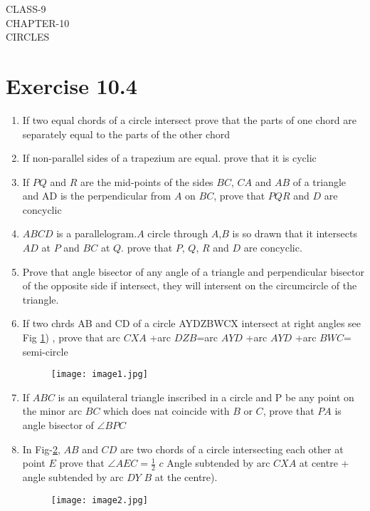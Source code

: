 \documentclass[12pt]{article}
\begin{document}
\begin{center}
\textbf\large{CLASS-9\\CHAPTER-10 \\ CIRCLES}
\end{center}
\section*{Exercise 10.4}
\begin{enumerate}
\item If two equal chords of a circle intersect prove that the parts of one chord are separately equal to the parts of the other chord
\item If non-parallel sides of a trapezium are equal. prove that it is cyclic
\item If $PQ$ and $R$ are the mid-points of the sides $BC$, $CA$ and $AB$ of a triangle and AD is the perpendicular from $A$ on $BC$, prove that $PQR$ and $D$ are concyclic
\item $ABCD$ is a parallelogram.$A$ circle through $A$,$B$ is so drawn that it intersects $AD$ at $P$ and $BC$ at $Q$. prove that $P$, $Q$, $R$ and $D$ are concyclic.
\item Prove that angle bisector of any angle of a triangle and perpendicular bisector of the opposite side if intersect, they will intersent on the circumcircle of the triangle.
\item If two chrds AB and CD of a circle AYDZBWCX intersect at right angles see Fig \ref{fig:1}) , prove that arc $CXA$ +arc $DZB$=arc $AYD$  +arc $AYD$ +arc $BWC$= semi-circle
	\begin{figure}[h!]                        \begin{center}                                   \texttt{[image: image1.jpg]}                          \end{center}                            \caption{}                                       \label{fig:1}                    \end{figure}
\item If $ABC$ is an equilateral triangle inscribed in a circle and P be any point on the minor arc $BC$ which does nat coincide with $B$ or $C$, prove that $PA$ is angle bisector of $\angle BPC$
\item In Fig-\ref{fig:2}, $AB$ and $CD$ are two chords of a circle intersecting each other at point $E$ prove that $\angle AEC=\frac{1}{2}$ $c$ Angle subtended by arc $CXA$ at centre + angle subtended by arc $DY$ $B$ at the centre).
	\begin{figure}[h!]                        \begin{center}                                   \texttt{[image: image2.jpg]}                          \end{center}                            \caption{}                                       \label{fig:2}                    \end{figure}

\end{enumerate}
\end{document}
